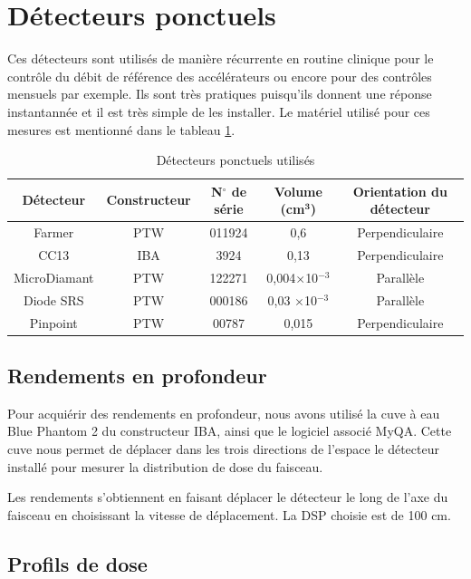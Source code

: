 \documentclass{book}
\begin{document}
\section{Détecteurs ponctuels}

Ces détecteurs sont utilisés de manière récurrente en routine clinique pour le contrôle du débit de référence des accélérateurs ou encore pour des contrôles mensuels par exemple. Ils sont très pratiques puisqu'ils donnent une réponse instantannée et il est très simple de les installer. Le matériel utilisé pour ces mesures est mentionné dans le tableau \ref*{table_detecteurs_ponctuels}.

\begin{table}[h]
  \centering
  \begin{tabular}{ccccc}
    \toprule
    \textbf{Détecteur} & \textbf{Constructeur} &  \textbf{N}$\mathbf{^{\circ}}$ \textbf{de série} & \textbf{Volume (cm}$\mathbf{^3}$\textbf{)} & \textbf{Orientation du détecteur}\\
    \toprule
    Farmer & PTW & 011924 & 0,6 & Perpendiculaire \\
    CC13 & IBA & 3924 & 0,13 & Perpendiculaire \\
    MicroDiamant & PTW & 122271 & 0,004$\times$10$^{-3}$ & Parallèle \\
    Diode SRS & PTW & 000186 & 0,03 $\times$10$^{-3}$ & Parallèle \\
    Pinpoint & PTW & 00787 & 0,015 & Perpendiculaire \\
    \bottomrule
  \end{tabular}
  \caption{Détecteurs ponctuels utilisés}
  \label{table_detecteurs_ponctuels}
\end{table}

\subsection{Rendements en profondeur}

Pour acquiérir des rendements en profondeur, nous avons utilisé la cuve à eau Blue Phantom 2 du constructeur IBA, ainsi que le logiciel associé MyQA. Cette cuve nous permet de déplacer dans les trois directions de l'espace le détecteur installé pour mesurer la distribution de dose du faisceau.

Les rendements s'obtiennent en faisant déplacer le détecteur le long de l'axe du faisceau en choisissant la vitesse de déplacement. La DSP choisie est de 100 cm.

\subsection{Profils de dose}
\end{document}
